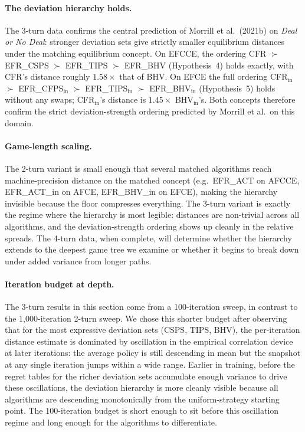 \documentclass[11pt]{article}
\begin{document}
\paragraph{The deviation hierarchy holds.} The 3-turn data confirms the central prediction of Morrill et al.~(2021b) on \emph{Deal or No Deal}: stronger deviation sets give strictly smaller equilibrium distances under the matching equilibrium concept. On EFCCE, the ordering CFR $\succ$ EFR\_CSPS $\succ$ EFR\_TIPS $\succ$ EFR\_BHV (Hypothesis~4) holds exactly, with CFR's distance roughly $1.58\times$ that of BHV. On EFCE the full ordering CFR$_\text{in}$ $\succ$ EFR\_CFPS$_\text{in}$ $\succ$ EFR\_TIPS$_\text{in}$ $\succ$ EFR\_BHV$_\text{in}$ (Hypothesis~5) holds without any swaps; CFR$_\text{in}$'s distance is $1.45\times$ BHV$_\text{in}$'s. Both concepts therefore confirm the strict deviation-strength ordering predicted by Morrill et al.\ on this domain.

\paragraph{Game-length scaling.} The 2-turn variant is small enough that several matched algorithms reach machine-precision distance on the matched concept (e.g.\ EFR\_ACT on AFCCE, EFR\_ACT\_in on AFCE, EFR\_BHV\_in on EFCE), making the hierarchy invisible because the floor compresses everything. The 3-turn variant is exactly the regime where the hierarchy is most legible: distances are non-trivial across all algorithms, and the deviation-strength ordering shows up cleanly in the relative spreads. The 4-turn data, when complete, will determine whether the hierarchy extends to the deepest game tree we examine or whether it begins to break down under added variance from longer paths.

\paragraph{Iteration budget at depth.} The 3-turn results in this section come from a 100-iteration sweep, in contrast to the 1{,}000-iteration 2-turn sweep. We chose this shorter budget after observing that for the most expressive deviation sets (CSPS, TIPS, BHV), the per-iteration distance estimate is dominated by oscillation in the empirical correlation device at later iterations: the average policy is still descending in mean but the snapshot at any single iteration jumps within a wide range. Earlier in training, before the regret tables for the richer deviation sets accumulate enough variance to drive these oscillations, the deviation hierarchy is more cleanly visible because all algorithms are descending monotonically from the uniform-strategy starting point. The 100-iteration budget is short enough to sit before this oscillation regime and long enough for the algorithms to differentiate.
\end{document}

